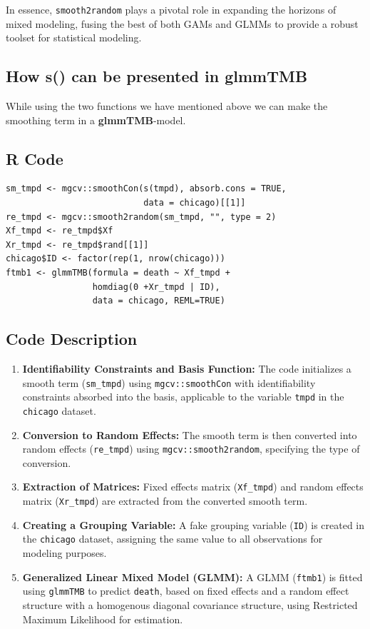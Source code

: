 \documentclass[12pt, twoside,hidelinks]{article}
\theoremstyle{definition}
\numberwithin{equation}{section}
\begin{document}
In essence, \texttt{smooth2random} plays a pivotal role in expanding the horizons of mixed modeling, fusing the best of both GAMs and GLMMs to provide a robust toolset for statistical modeling.

\newpage




\subsection{How s() can be presented in \textbf{glmmTMB}}

While using the two functions we have mentioned above we can make the smoothing term in a \textbf{glmmTMB}-model.
\subsection*{R Code}

\begin{verbatim}
sm_tmpd <- mgcv::smoothCon(s(tmpd), absorb.cons = TRUE, 
                           data = chicago)[[1]]             
re_tmpd <- mgcv::smooth2random(sm_tmpd, "", type = 2)
Xf_tmpd <- re_tmpd$Xf
Xr_tmpd <- re_tmpd$rand[[1]]
chicago$ID <- factor(rep(1, nrow(chicago)))
ftmb1 <- glmmTMB(formula = death ~ Xf_tmpd +
                 homdiag(0 +Xr_tmpd | ID), 
                 data = chicago, REML=TRUE)
\end{verbatim}

\subsection*{Code Description}

\begin{enumerate}
    \item \textbf{Identifiability Constraints and Basis Function:}
    The code initializes a smooth term (\texttt{sm\_tmpd}) using \texttt{mgcv::smoothCon} with identifiability constraints absorbed into the basis, applicable to the variable \texttt{tmpd} in the \texttt{chicago} dataset.

    \item \textbf{Conversion to Random Effects:}
    The smooth term is then converted into random effects (\texttt{re\_tmpd}) using \texttt{mgcv::smooth2random}, specifying the type of conversion.

    \item \textbf{Extraction of Matrices:}
    Fixed effects matrix (\texttt{Xf\_tmpd}) and random effects matrix (\texttt{Xr\_tmpd}) are extracted from the converted smooth term.

    \item \textbf{Creating a Grouping Variable:}
    A fake grouping variable (\texttt{ID}) is created in the \texttt{chicago} dataset, assigning the same value to all observations for modeling purposes.

    \item \textbf{Generalized Linear Mixed Model (GLMM):}
    A GLMM (\texttt{ftmb1}) is fitted using \texttt{glmmTMB} to predict \texttt{death}, based on fixed effects and a random effect structure with a homogenous diagonal covariance structure, using Restricted Maximum Likelihood for estimation.
\end{enumerate}
\end{document}
